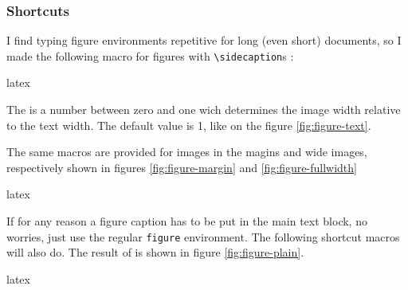 \documentclass[
	a4paper,
	raggedright,
	twoside,
	12pt,
	colorful,
]{tufte-style-article}
\begin{document}


\subsubsection{Shortcuts}

I find typing figure environments repetitive for long (even short) documents, so I made the following macro for figures with \texttt{\textbackslash sidecaption}s :

\begin{codebox}{latex}
\end{codebox}

The  is a number between zero and one wich determines the image width relative to the text width. The default value is 1, like on the figure \ref{fig:figure-text}.

The same macros are provided for images in the magins and wide images, respectively shown in figures \ref{fig:figure-margin} and \ref{fig:figure-fullwidth}

\begin{codebox}{latex}
\end{codebox}



If for any reason a figure caption has to be put in the main text block, no worries, just use the regular \texttt{figure} environment. The following shortcut macros will also do. The result of  is shown in figure \ref{fig:figure-plain}.

\begin{codebox}{latex}
\end{codebox}


\end{document}
